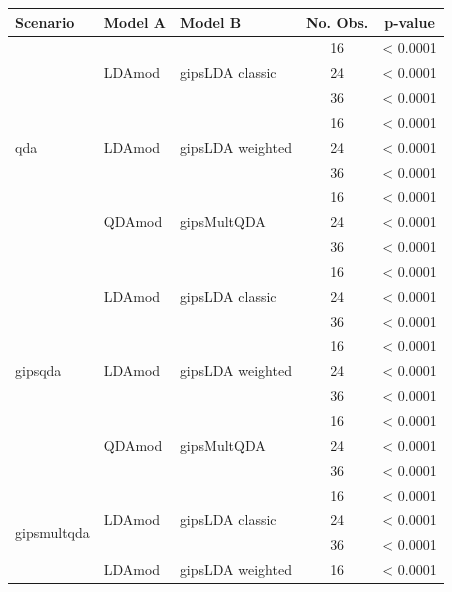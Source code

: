 \documentclass[a4paper,11pt,twoside]{report}
\theoremstyle{definition}
\begin{document}
\begin{table}[H]
    \centering
    \setlength{\tabcolsep}{4pt}
    \small
    \begin{tabular}{lllc c}
    \toprule
    \textbf{Scenario} & \textbf{Model A} & \textbf{Model B} & \textbf{No. Obs.} & \textbf{p-value} \\
    \midrule
    \multirow{9}{*}{qda}
      & \multirow{3}{*}{LDAmod} & \multirow{3}{*}{gipsLDA classic} & 16 & < 0.0001 \\
      & & & 24 & < 0.0001 \\
      & & & 36 & < 0.0001 \\
      \cmidrule{2-5}
      & \multirow{3}{*}{LDAmod} & \multirow{3}{*}{gipsLDA weighted} & 16 & < 0.0001 \\
      & & & 24 & < 0.0001 \\
      & & & 36 & < 0.0001 \\
      \cmidrule{2-5}
      & \multirow{3}{*}{QDAmod} & \multirow{3}{*}{gipsMultQDA} & 16 & < 0.0001 \\
      & & & 24 & < 0.0001 \\
      & & & 36 & < 0.0001 \\
    \midrule
    \multirow{9}{*}{gipsqda}
      & \multirow{3}{*}{LDAmod} & \multirow{3}{*}{gipsLDA classic} & 16 & < 0.0001 \\
      & & & 24 & < 0.0001 \\
      & & & 36 & < 0.0001 \\
      \cmidrule{2-5}
      & \multirow{3}{*}{LDAmod} & \multirow{3}{*}{gipsLDA weighted} & 16 & < 0.0001 \\
      & & & 24 & < 0.0001 \\
      & & & 36 & < 0.0001 \\
      \cmidrule{2-5}
      & \multirow{3}{*}{QDAmod} & \multirow{3}{*}{gipsMultQDA} & 16 & < 0.0001 \\
      & & & 24 & < 0.0001 \\
      & & & 36 & < 0.0001 \\
    \midrule
    \multirow{9}{*}{gipsmultqda}
      & \multirow{3}{*}{LDAmod} & \multirow{3}{*}{gipsLDA classic} & 16 & < 0.0001 \\
      & & & 24 & < 0.0001 \\
      & & & 36 & < 0.0001 \\
      \cmidrule{2-5}
      & \multirow{3}{*}{LDAmod} & \multirow{3}{*}{gipsLDA weighted} & 16 & < 0.0001 \\

\end{tabular}
\end{table}
\end{document}
